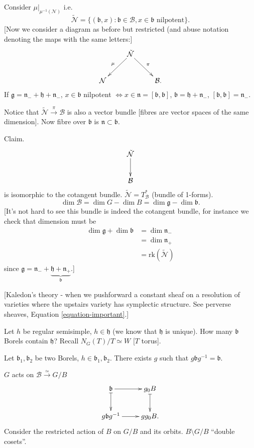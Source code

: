 \medskip\noindent
Consider $\mu|_{\mu^{-1}(\mathcal{N})}$ i.e.
$$
\tilde{\mathcal{N}}=\{(\mathfrak{b},x):
\mathfrak{b}
\in \mathcal{B},
x \in \mathfrak{b}\text{ nilpotent}\}.
$$
[Now we consider a diagram as before but
restricted (and abuse notation denoting the
maps with the same letters:]
$$
\xymatrix{
&
\tilde{\mathcal{N}}\ar[dr]^{\pi}\ar[dl]_{\mu}
\\
\mathcal{N} & & \mathcal{B}.
}
$$
If $\mathfrak{g}=\mathfrak{n}_-+\mathfrak{h}+
\mathfrak{n}_-$,
$x \in \mathfrak{b}$ nilpotent $\iff x \in
\mathfrak{n}
=[\mathfrak{b},\mathfrak{b}]$,
$\mathfrak{b}=\mathfrak{h}+\mathfrak{n}_-$,
$[\mathfrak{b},\mathfrak{b}]=\mathfrak{n}_-$.

Notice that
$\tilde{\mathcal{N}}\xrightarrow{\pi}
\mathcal{B}$
is also a vector bundle [fibres are vector
spaces of the same dimension]. Now fibre over
$\mathfrak{b}$ is $\mathfrak{n}\subset
\mathfrak{b}$.

Claim.
$$
\xymatrix{
\tilde{\mathcal{N}}\ar[d]\\\mathcal{B}
}
$$
is isomorphic to the cotangent bundle.
$\tilde{\mathcal{N}}=T^*_{\mathcal{B}}$
(bundle of 1-forms).
$$
\dim \mathcal{B}
=\dim G - \dim B
=\dim \mathfrak{g}- \dim \mathfrak{b}.
$$
[It's not hard to see this bundle is indeed
the cotangent bundle, for instance we check
that dimension must be
$$
\begin{aligned}
\dim \mathfrak{g}+\dim \mathfrak{b}
&=\dim \mathfrak{n}_-\\
&=\dim \mathfrak{n}_+\\
&=\text{rk}(\tilde{\mathcal{N}})
\end{aligned}
$$
since $\mathfrak{g}
=\mathfrak{n}_-+\underbrace{\mathfrak{h}+
\mathfrak{n}_+}_{\mathfrak{b}}$.]

[Kaledon's theory - when we pushforward a
constant sheaf on a resolution of varieties
where the upstairs variety has symplectic
structure. See perverse sheaves, Equation
\ref{equation-important}.]

\medskip\noindent
Let $h$ be regular semisimple, $h \in
\mathfrak{h}$ (we know that $\mathfrak{h}$ is
unique). How many $\mathfrak{b}$ Borels
contain $\mathfrak{h}$? Recall $N_G(T)/T
\simeq W$ [$T$ torus].

\medskip\noindent
Let $\mathfrak{b}_1,\mathfrak{b}_2$ be two
Borels, $h \in
\mathfrak{b}_1,\mathfrak{b}_2$. There exists
$g$ such that
$g\mathfrak{b}g^{-1}=\mathfrak{b}$.

\begin{remark}
\label{remark-flag}
$G$ acts on
$\mathcal{B}\xrightarrow{\simeq}G/B$
$$
\xymatrix{
\mathfrak{b}\ar@{|->}[d]\ar[r]&
g_0B\ar@{|->}[d]\\
g\mathfrak{b}g^{-1}\ar[r]&g g_0B.
}
$$
Consider the restricted action of $B$ on
$G/B$ and its orbits. $B\setminus G/B$
``double cosets''.
\end{remark}

